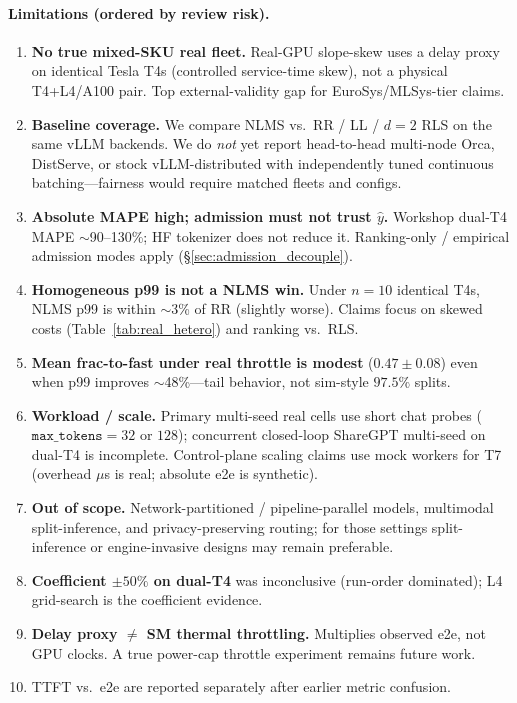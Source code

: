 \documentclass[10pt,twocolumn,letterpaper]{article}
\begin{document}
\paragraph{Limitations (ordered by review risk).}
\label{sec:threats}
\begin{enumerate}
\item \textbf{No true mixed-SKU real fleet.} Real-GPU slope-skew uses a delay proxy on identical Tesla T4s (controlled service-time skew), not a physical T4+L4/A100 pair. Top external-validity gap for EuroSys/MLSys-tier claims.
\item \textbf{Baseline coverage.} We compare NLMS vs.\ RR / LL / $d{=}2$ RLS on the same vLLM backends. We do \emph{not} yet report head-to-head multi-node Orca, DistServe, or stock vLLM-distributed with independently tuned continuous batching---fairness would require matched fleets and configs.
\item \textbf{Absolute MAPE high; admission must not trust $\hat{y}$.} Workshop dual-T4 MAPE $\sim$90--130\%; HF tokenizer does not reduce it. Ranking-only / empirical admission modes apply (\S\ref{sec:admission_decouple}).
\item \textbf{Homogeneous p99 is not a NLMS win.} Under $n{=}10$ identical T4s, NLMS p99 is within $\sim$3\% of RR (slightly worse). Claims focus on skewed costs (Table~\ref{tab:real_hetero}) and ranking vs.\ RLS.
\item \textbf{Mean frac-to-fast under real throttle is modest} ($0.47\pm0.08$) even when p99 improves $\sim$48\%---tail behavior, not sim-style $97.5\%$ splits.
\item \textbf{Workload / scale.} Primary multi-seed real cells use short chat probes ($\texttt{max\_tokens}{=}32$ or $128$); concurrent closed-loop ShareGPT multi-seed on dual-T4 is incomplete. Control-plane scaling claims use mock workers for T7 (overhead $\mu$s is real; absolute e2e is synthetic).
\item \textbf{Out of scope.} Network-partitioned / pipeline-parallel models, multimodal split-inference, and privacy-preserving routing; for those settings split-inference or engine-invasive designs may remain preferable.
\item \textbf{Coefficient $\pm50\%$ on dual-T4} was inconclusive (run-order dominated); L4 grid-search is the coefficient evidence.
\item \textbf{Delay proxy $\neq$ SM thermal throttling.} Multiplies observed e2e, not GPU clocks. A true power-cap throttle experiment remains future work.
\item TTFT vs.\ e2e are reported separately after earlier metric confusion.
\end{enumerate}
\end{document}
